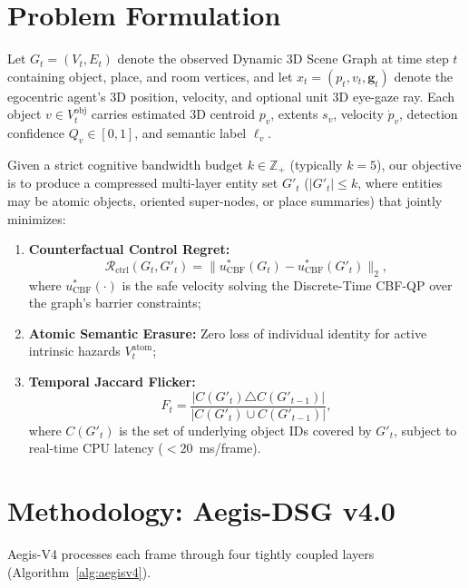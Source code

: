 \documentclass[journal]{IEEEtran}
\begin{document}
\section{Problem Formulation}
Let $G_t = (V_t, E_t)$ denote the observed Dynamic 3D Scene Graph at time step $t$ containing object, place, and room vertices, and let $x_t = (p_t, v_t, \mathbf{g}_t)$ denote the egocentric agent's 3D position, velocity, and optional unit 3D eye-gaze ray. Each object $v \in V_t^{\text{obj}}$ carries estimated 3D centroid $p_v$, extents $s_v$, velocity $\dot{p}_v$, detection confidence $Q_v \in [0, 1]$, and semantic label $\ell_v$.

Given a strict cognitive bandwidth budget $k \in \mathbb{Z}_+$ (typically $k = 5$), our objective is to produce a compressed multi-layer entity set $G'_t$ ($|G'_t| \le k$, where entities may be atomic objects, oriented super-nodes, or place summaries) that jointly minimizes:
\begin{enumerate}
    \item \textbf{Counterfactual Control Regret:}
    \begin{equation}
        \mathcal{R}_{\text{ctrl}}(G_t, G'_t) = \big\| u^*_{\text{CBF}}(G_t) - u^*_{\text{CBF}}(G'_t) \big\|_2,
        \label{eq:regret}
    \end{equation}
    where $u^*_{\text{CBF}}(\cdot)$ is the safe velocity solving the Discrete-Time CBF-QP over the graph's barrier constraints;
    \item \textbf{Atomic Semantic Erasure:} Zero loss of individual identity for active intrinsic hazards $V_t^{\text{atom}}$;
    \item \textbf{Temporal Jaccard Flicker:}
    \begin{equation}
        F_t = \frac{|C(G'_t) \triangle C(G'_{t-1})|}{|C(G'_t) \cup C(G'_{t-1})|},
    \end{equation}
    where $C(G'_t)$ is the set of underlying object IDs covered by $G'_t$, subject to real-time CPU latency ($<20$~ms/frame).
\end{enumerate}

\section{Methodology: Aegis-DSG v4.0}
Aegis-V4 processes each frame through four tightly coupled layers (Algorithm~\ref{alg:aegisv4}).
\end{document}
